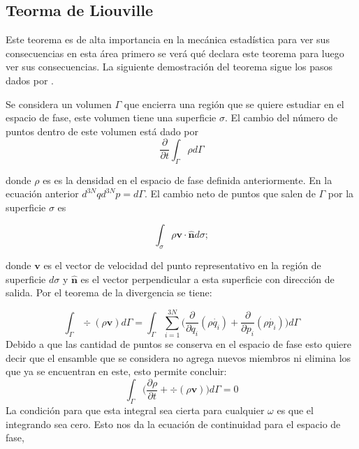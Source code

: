 \subsection{Teorma de Liouville }
Este teorema es de alta importancia en la mecánica estadística para ver sus consecuencias en esta área primero se verá qué declara este teorema para luego ver sus consecuencias. La siguiente demostración del teorema sigue los pasos dados por \cite{PathriaStat}. 

Se considera un volumen $\Gamma$ que encierra una región que se quiere estudiar en el espacio de fase,  este volumen tiene una superficie $\sigma$. El cambio del número de puntos dentro de este volumen está dado por 
\begin{equation}
\frac{\partial}{\partial t} \int_{\Gamma} \rho d\Gamma
\end{equation}

donde $\rho$ es es la densidad en el espacio de fase definida anteriormente. En la ecuación anterior $d^{3N}q d^{3N}p=d\Gamma$. 
El cambio neto de puntos que salen de $\Gamma$ por la superficie $\sigma$ es

\begin{equation}
\int_{\sigma} \rho \mathbf{v \cdot \hat{n}} d\sigma;
\end{equation}

donde $\mathbf{v}$ es el vector de velocidad del punto representativo en la región de superficie $d\sigma$ y $\mathbf{\hat{n}}$ es el vector perpendicular a esta superficie con dirección de salida. Por el teorema de la divergencia se tiene:

\begin{equation}
\int_{\Gamma} \div{ ( \rho\mathbf{v} ) } d\Gamma = \int_{\Gamma} \sum_{i=1}^{3N} \Big( \frac{\partial}{\partial q_{i}}(\rho \dot{q_{i}})+ \frac{\partial}{\partial p_{i}} (\rho \dot{p_{i}}) \Big) d\Gamma
\end{equation}
Debido a que las cantidad de puntos se conserva en el espacio de fase esto quiere decir que el ensamble que se considera no agrega nuevos miembros ni elimina los que ya se encuentran en este, esto permite concluir:
\begin{equation}
 \int_{\Gamma} \Big( \frac{\partial \rho}{\partial t} + \div{ ( \rho\mathbf{v} ) } \Big) d\Gamma =0
\end{equation}
La condición para que esta integral sea cierta para cualquier $\omega$ es que el integrando sea cero. Esto nos da la ecuación de continuidad para el espacio de fase,

